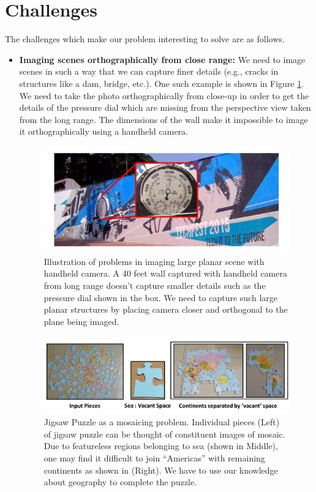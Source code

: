\section{Challenges}
The challenges which make our problem interesting to solve are as follows. 
\begin{itemize}
  \item \textbf{Imaging scenes orthographically from close range:}
We need to image scenes in such a way that we can capture finer details
(e.g., cracks in structures like a dam, bridge, etc.). One such example is shown
in Figure \ref{fig:orthographicView}. We need to take the photo
orthographically from close-up in order to get the details of the pressure dial
which are missing from the perspective view taken from the long range. The
dimensions of the wall make it impossible to image it orthographically  using
a handheld camera. 

\begin{figure}[h!]
\centering
\includegraphics[width=0.98\linewidth]{figures/orthographicView}
\caption[Problems in imaging large scene using handheld camera]{Illustration of
problems in imaging large planar scene with handheld camera. A 40 feet wall
captured with handheld camera from long range doesn't capture smaller details
such as the pressure dial shown in the box. We need to capture such large
planar structures by placing camera closer and orthogonal to the plane being imaged.}
\label{fig:orthographicView}
\end{figure}

\begin{figure}[h!]
\centering
\includegraphics[width=0.98\linewidth]{figures/vacantSpaces}
\caption[Jigsaw Puzzle as a mosaicing problem]{Jigsaw Puzzle as a mosaicing
problem. Individual pieces (Left) of jigsaw puzzle can be thought of constituent images of mosaic. Due to featureless
regions belonging to sea (shown in Middle), one may find it difficult to join
``Americas'' with remaining continents as shown in (Right). We have to use
our knowledge about geography to complete the puzzle.}
\label{fig:vacantSpaces}
\end{figure}
  

\end{itemize}
